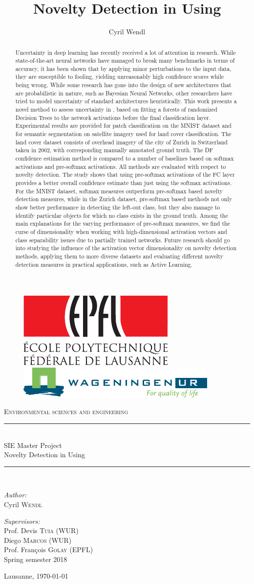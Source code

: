 \documentclass[10pt]{article}
\author{Cyril Wendl}
\title{Novelty Detection in \acrlongpl{CNN} Using \acrlongpl{DF}
}
\newcommand{\maketitlepage}{
    \begin{titlepage}
    	\begin{center}
    		\begin{figure}[H]
    			\centering
    			\includegraphics[height=.09\textwidth]{logo} 
    			\hspace{1cm}
    			\includegraphics[height=.07\textwidth]{logo_wur_quality_of_life}
    		\end{figure}
    		\textsc{Environmental sciences and engineering}\\[0.5cm]
    		
    		\newcommand{\HRule}{\rule{\linewidth}{0.2mm}}
    		\HRule \\[0.5cm]
    		{\large SIE Master Project}\\[0.2cm]
    		{\huge Novelty Detection in \acrlongpl{CNN} Using \acrlongpl{DF}
    		}\\[0.5cm]
    		\HRule \\[0.5cm]
    		
    		\begin{minipage}[t]{0.45\textwidth}
    			\begin{flushleft} \large
    				\emph{Author:}\\[0.2cm]
    				Cyril \textsc{Wendl}
    			\end{flushleft}
    		\end{minipage}
    		\hfill
    		\begin{minipage}[t]{0.45\textwidth}
    			\begin{flushright} \large
    				\emph{Supervisors:}\\[0.2cm]
    				Prof. Devis \textsc{Tuia} (WUR)\\
    				Diego \textsc{Marcos} (WUR)\\
    				Prof. François \textsc{Golay} (EPFL)\\
    				Spring semester 2018
    			\end{flushright}
    		\end{minipage}
    		\vfill
    		
    		{\large Lausanne, \today}
    	\end{center}
    \end{titlepage}
}
\begin{document}
\maketitlepage

\vfill
\maketitle
\begin{abstract}
Uncertainty in deep learning has recently received a lot of attention in research. While state-of-the-art neural networks have managed to break many benchmarks in terms of accuracy, it has been shown that by applying minor perturbations to the input data, they are susceptible to fooling, yielding unreasonably high confidence scores while being wrong. While some research has gone into the design of new architectures that are probabilistic in nature, such as Bayesian Neural Networks, other researchers have tried to model uncertainty of standard architectures heuristically. This work presents a novel method to assess uncertainty in , based on fitting a forests of randomized Decision Trees to the network activations before the final classification layer. Experimental results are provided for patch classification on the \acrshort{MNIST} dataset and for semantic segmentation on satellite imagery used for land cover classification. The land cover dataset consists of overhead imagery of the city of Zurich in Switzerland taken in 2002, with corresponding manually annotated ground truth. The \acrlong{DF} confidence estimation method is compared to a number of baselines based on softmax activations and pre-softmax activations. All methods are evaluated with respect to novelty detection. The study shows that using pre-softmax activations of the \acrlong{FC} layer provides a better overall confidence estimate than just using the softmax activations. For the \acrshort{MNIST} dataset, softmax measures outperform pre-softmax based novelty detection measures, while in the Zurich dataset, pre-softmax based methods not only show better performance in detecting the left-out class, but they also manage to identify particular objects for which no class exists in the ground truth. Among the main explanations for the varying performance of pre-softmax measures, we find the curse of dimensionality when working with high-dimensional activation vectors and class separability issues due to partially trained networks. Future research should go into studying the influence of the activation vector dimensionality on novelty detection methods, applying them to more diverse datasets and evaluating different novelty detection measures in practical applications, such as Active Learning.
\end{abstract}
\end{document}
